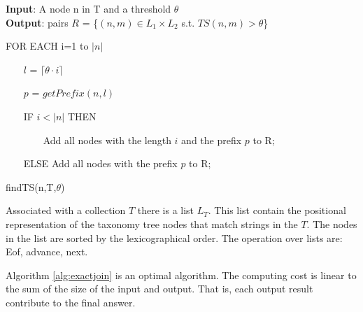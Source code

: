 \begin{algorithm}
{\bf Input}: A node n in T and a threshold $\theta$ \\
{\bf Output}:  pairs $R$ = \{$(n,m) \in L_1 \times L_2$ s.t. $TS(n,m) > \theta$\}
\begin{compactenum}[(1)]
\item FOR EACH i=1 to $|n|$
\item ~~~ $l$ = $\lceil \theta \cdot i \rceil$
\item ~~~ $p$ = $getPrefix(n,l)$
\item ~~~ IF $i < |n|$ THEN
\item ~~~~~~~ Add all nodes with the length $i$ and the prefix $p$ to R;
\item ~~~ ELSE   Add all nodes with the prefix $p$ to R;
\end{compactenum}

%
%


 \caption{findTS(n,T,$\theta$)}
\label{alg:treejoin}
\end{algorithm}


Associated with a collection $T$ there is a list $L_T$. This list contain the positional representation of the taxonomy tree nodes that match strings in the $T$. The nodes in the list are sorted by the lexicographical order. The operation over lists are: Eof, advance, next.


\begin{theorem}  Algorithm \ref{alg:exactjoin} is an optimal algorithm. The computing cost is linear to the sum of the size of the input and output. That is, each output result contribute to the final answer.
\end{theorem}




